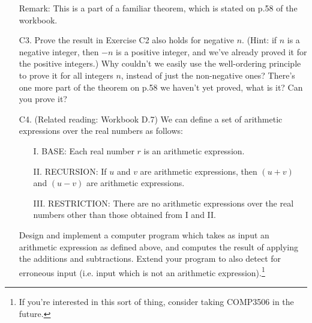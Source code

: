 \documentclass[a4paper,12pt]{article}
\begin{document}
\begin{enumerate}
Remark: This is a part of a familiar theorem, which is stated on p.58 of the
workbook.
\item[C3.]
Prove the result in Exercise C2 also holds for negative $n$.
(Hint: if $n$ is a negative integer, then $-n$ is a positive integer, and we've
already proved it for the positive integers.)
Why couldn't we easily use the well-ordering principle to prove it for all
integers $n$, instead of just the non-negative ones?
There's one more part of the theorem on p.58 we haven't yet proved,
what is it? Can you prove it?
\item[C4.] (Related reading: Workbook D.7)
We can define a set of arithmetic expressions over the real numbers as follows:
\begin{itemize}
\item[I.] BASE: Each real number $r$ is an arithmetic expression.
\item[II.] RECURSION: If $u$ and $v$ are arithmetic expressions, then $(u+v)$
and $(u-v)$ are arithmetic expressions.
\item[III.] RESTRICTION: There are no arithmetic expressions over the real
numbers other than those obtained from I and II.
\end{itemize}
Design and implement a computer program which takes as input an arithmetic
expression as defined above, and computes the result of applying the
additions and subtractions. Extend your program to also detect for erroneous
input (i.e. input which is not an arithmetic expression).\footnote{If you're
interested in this sort of thing, consider taking COMP3506 in the future.}
\end{enumerate}


\end{document}
